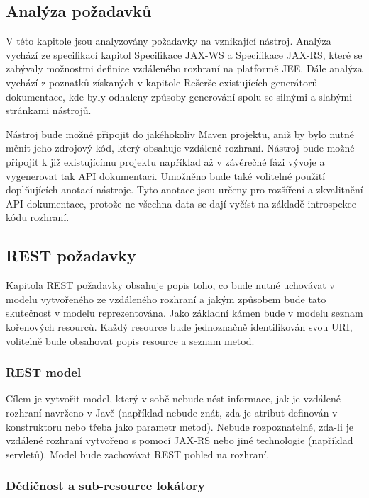 \documentclass[11pt,twoside,a4paper]{book}
\begin{document}
\begin{itemize}
\section{Analýza požadavků}

V této kapitole jsou analyzovány požadavky na vznikající nástroj. Analýza vychází ze
specifikací kapitol Specifikace JAX-WS a Specifikace JAX-RS, které se zabývaly možnostmi
definice vzdáleného rozhraní na platformě JEE. Dále analýza vychází z poznatků získaných v
kapitole Rešerše existujících generátorů dokumentace, kde byly odhaleny způsoby generování
spolu se silnými a slabými stránkami nástrojů.

Nástroj bude možné připojit do jakéhokoliv Maven projektu, aniž by bylo nutné měnit jeho
zdrojový kód, který obsahuje vzdálené rozhraní. Nástroj bude možné připojit k již
existujícímu projektu například až v závěrečné fázi vývoje a vygenerovat tak API
dokumentaci. Umožněno bude také volitelné použití doplňujících anotací nástroje. Tyto
anotace jsou určeny pro rozšíření a zkvalitnění API dokumentace, protože ne všechna data se
dají vyčíst na základě introspekce kódu rozhraní.

\subsection{REST požadavky}

Kapitola REST požadavky obsahuje popis toho, co bude nutné uchovávat v modelu
vytvořeného ze vzdáleného rozhraní a jakým způsobem bude tato skutečnost v modelu
reprezentována. Jako základní kámen bude v modelu seznam kořenových resourců. Každý
resource bude jednoznačně identifikován svou URI, volitelně bude obsahovat popis resource a
seznam metod.

\subsubsection{REST model}

Cílem je vytvořit model, který v sobě nebude nést informace, jak je vzdálené rozhraní
navrženo v Javě (například nebude znát, zda je atribut definován v konstruktoru nebo třeba
jako parametr metod). Nebude rozpoznatelné, zda-li je vzdálené rozhraní vytvořeno s pomocí
JAX-RS nebo jiné technologie (například servletů). Model bude zachovávat REST pohled na
rozhraní.

\subsubsection{Dědičnost a sub-resource lokátory}


\end{itemize}
\end{document}
